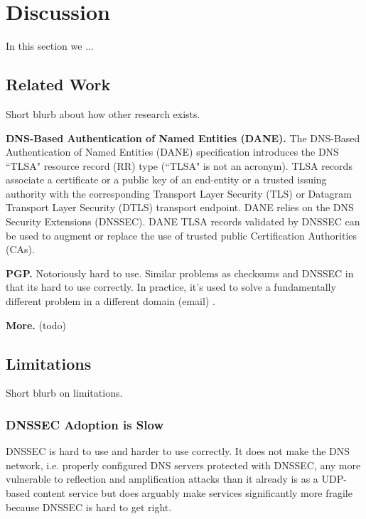 \section{Discussion} \label{sec:discussion}

In this section we ...

\subsection{Related Work}

Short blurb about how other research exists.

\textbf{DNS-Based Authentication of Named Entities (DANE).}    The DNS-Based
Authentication of Named Entities (DANE) specification \cite{DANE1, DANE2, DANE3}
introduces the DNS ``TLSA" resource record (RR) type (``TLSA" is not an acronym).
TLSA records associate a certificate or a public key of an end-entity or a
trusted issuing authority with the corresponding Transport Layer Security (TLS)
or Datagram Transport Layer Security (DTLS) transport endpoint. DANE relies on
the DNS Security Extensions (DNSSEC). DANE TLSA records validated by DNSSEC can
be used to augment or replace the use of trusted public Certification
Authorities (CAs).

\textbf{PGP.}   Notoriously hard to use. Similar problems as checksums and
DNSSEC in that its hard to use correctly. In practice, it's used to solve a
fundamentally different problem in a different domain (email) \cite{OpenPGP1}.

\textbf{More.}    (todo)

\subsection{Limitations}

Short blurb on limitations.

\subsubsection{DNSSEC Adoption is Slow}

DNSSEC is hard to use and harder to use
correctly. It does not make the DNS network, i.e. properly configured DNS
servers protected with DNSSEC, any more vulnerable to reflection \cite{Neustar}
and amplification \cite{Ariya, DNSSEC-is-hard-1, DNSSEC-is-hard-2,
DNSSEC-is-hard-3, DNSSEC-is-hard-4} attacks than it already is as a UDP-based
content service \cite{USCERT, Vixie} but does arguably make services
significantly more fragile because DNSSEC is hard to get right.

